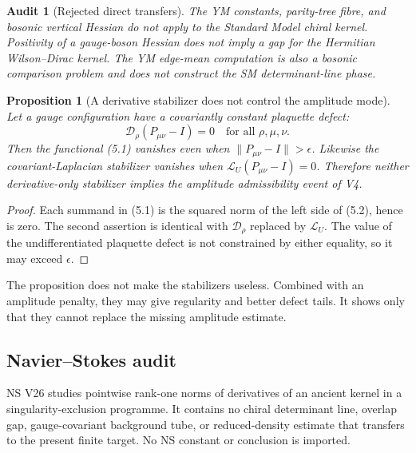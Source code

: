 \documentclass[11pt]{article}
\newtheorem{proposition}[theorem]{Proposition}
\newtheorem{audit}[theorem]{Audit}
\begin{document}
\begin{audit}[Rejected direct transfers]
\label{audit:v11v5-rejected}
The YM constants, parity-tree fibre, and bosonic vertical Hessian do not
apply to the Standard Model chiral kernel.  Positivity of a gauge-boson
Hessian does not imply a gap for the Hermitian Wilson--Dirac kernel.
The YM edge-mean computation is also a bosonic comparison problem and
does not construct the SM determinant-line phase.
\end{audit}

\begin{proposition}[A derivative stabilizer does not control the amplitude
mode]
\label{prop:v11v5-derivative-mode}
Let a gauge configuration have a covariantly constant plaquette defect:
\[
 \mathcal D_\rho(P_{\mu\nu}-I)=0
 \quad\text{for all }\rho,\mu,\nu.
 \tag{5.2}
\]
Then the functional (5.1) vanishes even when
\(\|P_{\mu\nu}-I\|>\epsilon\).  Likewise the covariant-Laplacian
stabilizer vanishes when
\(\mathcal L_U(P_{\mu\nu}-I)=0\).  Therefore neither derivative-only
stabilizer implies the amplitude admissibility event of V4.
\end{proposition}

\begin{proof}
Each summand in (5.1) is the squared norm of the left side of (5.2), hence
is zero.  The second assertion is identical with
\(\mathcal D_\rho\) replaced by \(\mathcal L_U\).  The value of the
undifferentiated plaquette defect is not constrained by either equality,
so it may exceed \(\epsilon\).
\end{proof}

The proposition does not make the stabilizers useless.  Combined with an
amplitude penalty, they may give regularity and better defect tails.  It
shows only that they cannot replace the missing amplitude estimate.

\subsection{Navier--Stokes audit}

NS V26 studies pointwise rank-one norms of derivatives of an ancient
kernel in a singularity-exclusion programme.  It contains no chiral
determinant line, overlap gap, gauge-covariant background tube, or
reduced-density estimate that transfers to the present finite target.
No NS constant or conclusion is imported.
\end{document}
